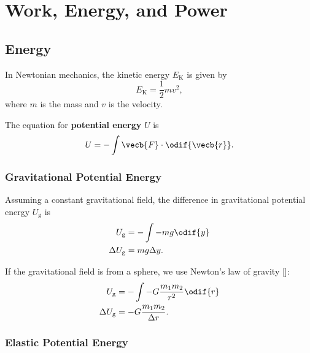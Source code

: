 \chapter{Work, Energy, and Power}


\section{Energy}

In Newtonian mechanics, the kinetic energy \(E_\mathrm{K}\) is given by
\begin{equation} \label{eq:linear-kinetic-energy}
    E_\mathrm{K} = \frac{1}{2} m v^2,
\end{equation}
where \(m\) is the mass and \(v\) is the velocity.

The equation for \textbf{potential energy} \(U\) is
\begin{equation} \label{eq:potential-energy}
    U = - \int \vecb{F} \cdot \odif{\vecb{r}}.
\end{equation}

\subsection{Gravitational Potential Energy}

Assuming a constant gravitational field,
the difference in gravitational potential energy \(U_\mathrm{g}\) is
\begin{equation}
    \begin{aligned}
        U_\mathrm{g} &= - \int - m g \odif{y} \\
        \Delta{U_\mathrm{g}} &= m g \Delta{y}.
    \end{aligned}
\end{equation}

If the gravitational field is from a sphere,
we use Newton's law of gravity []:
\begin{equation}
    \begin{aligned}
        U_\mathrm{g} &= - \int - G \frac{m_1 m_2}{r^2} \odif{r} \\
        \Delta{U_\mathrm{g}} &= - G \frac{m_1 m_2}{\Delta{r}}.
    \end{aligned}
\end{equation}

\subsection{Elastic Potential Energy}

